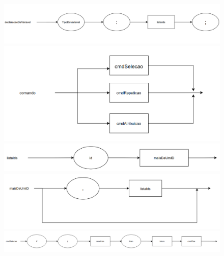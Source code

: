 \documentclass[11pt]{article}
\begin{document}
\newpage

\begin{figure}[H]
   \includegraphics[]{grafos_sintaticos/declaracao_de_variavel.png}

   \includegraphics[]{grafos_sintaticos/comando.png}

   \includegraphics[]{grafos_sintaticos/lista_ids.png}

   \includegraphics[]{grafos_sintaticos/mais_de_um_id.png}

   \includegraphics[scale=1.5]{grafos_sintaticos/cmd_selecao.png}



  
\end{figure}


\newpage
\end{document}
